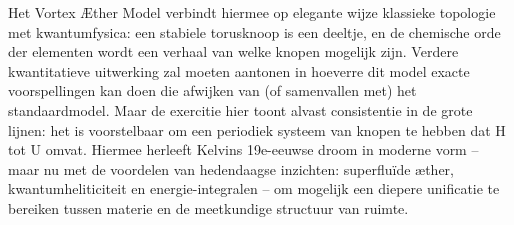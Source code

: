 Het Vortex Æther Model verbindt hiermee op elegante wijze klassieke topologie met kwantumfysica: een stabiele torusknoop is een deeltje, en de chemische orde der elementen wordt een verhaal van welke knopen mogelijk zijn. Verdere kwantitatieve uitwerking zal moeten aantonen in hoeverre dit model exacte voorspellingen kan doen die afwijken van (of samenvallen met) het standaardmodel. Maar de exercitie hier toont alvast consistentie in de grote lijnen: het is voorstelbaar om een periodiek systeem van knopen te hebben dat H tot U omvat. Hiermee herleeft Kelvin\rqs s 19e-eeuwse droom in moderne vorm – maar nu met de voordelen van hedendaagse inzichten: superfluïde æther, kwantumheliticiteit en energie-integralen – om mogelijk een diepere unificatie te bereiken tussen materie en de meetkundige structuur van ruimte.
